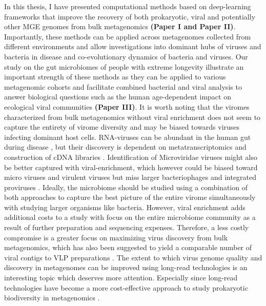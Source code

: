 \noindent
In this thesis, I have presented computational methods based on deep-learning frameworks that improve the recovery of both prokaryotic, viral and potentially other MGE genomes from bulk metagenomics \textbf{(Paper I and Paper II)}. Importantly, these methods can be applied across metagenomes collected from different environments and allow investigations into dominant hubs of viruses and bacteria in disease and co-evolutionary dynamics of bacteria and viruses. Our study on the gut microbiomes of people with extreme longevity illustrate an important strength of these methods as they can be applied to various metagenomic cohorts and facilitate combined bacterial and viral analysis to answer biological questions such as the human age-dependent impact on ecological viral communities \textbf{(Paper III)}. It is worth noting that the viromes characterized from bulk metagenomics without viral enrichment does not seem to capture the entirety of virome diversity and may be biased towards viruses infecting dominant host cells. RNA-viruses can be abundant in the human gut during disease \cite{Zuo2021-ll}, but their discovery is dependent on metatranscriptomics and construction of cDNA libraries \cite{Callanan2020-xy}. Identification of Microviridae viruses might also be better captured with viral-enrichment, which however could be biased toward micro viruses and virulent viruses but miss larger bacteriophages and integrated proviruses \cite{Roux2019-dc,Parras-Molto2018-wy,Gregory2020-gu}. Ideally, the microbiome should be studied using a combination of both approaches to capture the best picture of the entire virome simultaneously with studying larger organisms like bacteria. However, viral enrichment adds additional costs to a study with focus on the entire microbiome community as a result of further preparation and sequencing expenses. Therefore, a less costly compromise is a greater focus on maximizing virus discovery from bulk metagenomics, which has also been suggested to yield a comparable number of viral contigs to VLP preparations \cite{Gregory2020-gu}. The extent to which virus genome quality and discovery in metagenomes can be improved using long-read technologies is an interesting topic which deserves more attention. Especially since long-read technologies have become a more cost-effective approach to study prokaryotic biodiversity in metagenomics \cite{Moss2020-ot,Sereika2022-ii}.\\

